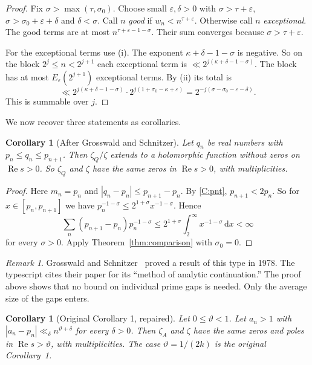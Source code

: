 \documentclass[12pt,letterpaper]{article}
\newtheorem{corollary}[theorem]{Corollary}
\theoremstyle{definition}
\theoremstyle{remark}
\newtheorem{remark}[theorem]{Remark}
\newcommand{\Ree}{\operatorname{Re}}
\newcommand{\dd}{\,\mathrm{d}}
\newcommand{\eps}{\varepsilon}
\begin{document}
\begin{proof}
Fix $\sigma>\max(\tau,\sigma_0)$. Choose small $\eps,\delta>0$ with
$\sigma>\tau+\eps$, $\sigma>\sigma_0+\eps+\delta$ and $\delta<\sigma$.
Call $n$ \emph{good} if $w_n<n^{\tau+\eps}$. Otherwise call $n$
\emph{exceptional}. The good terms are at most $n^{\tau+\eps-1-\sigma}$.
Their sum converges because $\sigma>\tau+\eps$.

For the exceptional terms use (i). The exponent $\kappa+\delta-1-\sigma$
is negative. So on the block $2^j\le n<2^{j+1}$ each exceptional term is
$\ll 2^{j(\kappa+\delta-1-\sigma)}$. The block has at most
$E_\eps(2^{j+1})$ exceptional terms. By (ii) its total is
\[
\ll 2^{j(\kappa+\delta-1-\sigma)}\cdot2^{j(1+\sigma_0-\kappa+\eps)}
=2^{-j(\sigma-\sigma_0-\eps-\delta)}.
\]
This is summable over $j$.
\end{proof}

We now recover three statements as corollaries.

\begin{corollary}[After Grosswald and Schnitzer]\label{cor:GS}
Let $q_n$ be real numbers with $p_n\le q_n\le p_{n+1}$. Then $\zeta_Q/\zeta$
extends to a holomorphic function without zeros on $\Ree s>0$. So
$\zeta_Q$ and $\zeta$ have the same zeros in $\Ree s>0$, with
multiplicities.
\end{corollary}

\begin{proof}
Here $m_n=p_n$ and $|q_n-p_n|\le p_{n+1}-p_n$. By \ref{C:pnt},
$p_{n+1}<2p_n$. So for $x\in[p_n,p_{n+1}]$ we have
$p_n^{-1-\sigma}\le2^{1+\sigma}x^{-1-\sigma}$. Hence
\[
\sum_n(p_{n+1}-p_n)p_n^{-1-\sigma}
\le2^{1+\sigma}\int_2^\infty x^{-1-\sigma}\dd x<\infty
\]
for every $\sigma>0$. Apply Theorem~\ref{thm:comparison} with
$\sigma_0=0$.
\end{proof}

\begin{remark}
Grosswald and Schnitzer~\cite{GS78} proved a result of this type in 1978.
The typescript cites their paper for its ``method of analytic
continuation.'' The proof above shows that no bound on individual prime
gaps is needed. Only the average size of the gaps enters.
\end{remark}

\begin{corollary}[Original Corollary 1, repaired]\label{cor:pointwise}
Let $0\le\vartheta<1$. Let $a_n>1$ with $|a_n-p_n|\ll_\delta
n^{\vartheta+\delta}$ for every $\delta>0$. Then $\zeta_A$ and $\zeta$
have the same zeros and poles in $\Ree s>\vartheta$, with multiplicities.
The case $\vartheta=1/(2k)$ is the original Corollary~1.
\end{corollary}
\end{document}
